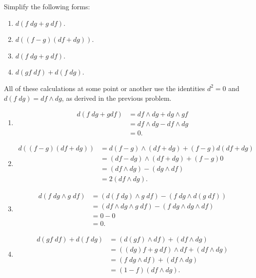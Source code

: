 \documentclass[10pt]{report}
\begin{document}
\begin{exer}[1.6.4]
	Simplify the following forms:
	\begin{enumerate}
		\item $d(f\;dg+g\;df)$.
		\item $d( (f-g)(df+dg))$.
		\item $d(f\;dg+g\;df)$.
		\item $d(gf\;df)+d(f\;dg)$.
	\end{enumerate}
\end{exer}
All of these calculations at some point or another use the identities $d^2 = 0$ and $d(f\;dg) = df\wedge dg$, as derived in the previous problem.
\begin{enumerate}
	\item
		\begin{align*}
			d(f\;dg+gdf) &= df\wedge dg+dg\wedge gf \\
				     &= df\wedge dg - df\wedge dg \\
				     &= 0.
		\end{align*}

	\item 
		\begin{align*}
			d( (f-g)(df+dg)) &= d(f-g) \wedge (df+dg) + (f-g) d(df+dg) \\
					 &= (df-dg) \wedge (df+dg) + (f-g) 0 \\
					 &= (df\wedge dg) - (dg\wedge df) \\
					 &= 2(df \wedge dg).
		\end{align*}

	\item 
		\begin{align*}
			d(f\;dg\wedge g\;df) &= (d(f\;dg)\wedge g\;df) - (f\;dg \wedge d(g\;df)) \\
					     &= (df\wedge dg \wedge g\;df) - (f\;dg \wedge dg\wedge df) \\
					     &= 0 - 0 \\
					     &= 0.
		\end{align*}

	\item 
		\begin{align*}
			d(gf\;df) + d(f\;dg) &= (d(gf)\wedge df)+(df\wedge dg) \\
					     &= ( (dg)f + g\;df)\wedge df + (df\wedge dg) \\
					     &= (f\;dg\wedge df) + (df \wedge dg) \\
					     &= (1-f)(df\wedge dg).
		\end{align*}
\end{enumerate}
\end{document}
